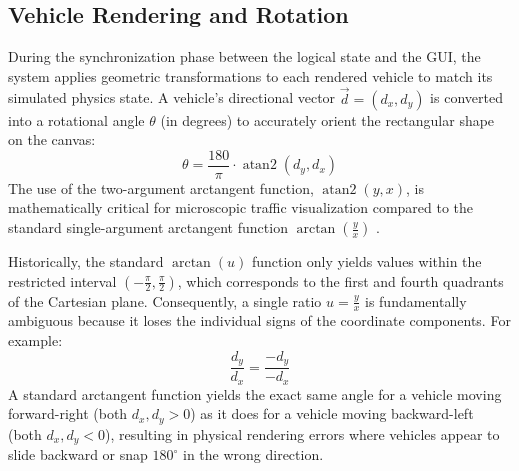 \documentclass[../report_main.tex]{subfiles}
\begin{document}
\subsection{Vehicle Rendering and Rotation}
During the synchronization phase between the logical state and the \gls{GUI}, the system applies geometric transformations to each rendered vehicle to match its simulated physics state. A vehicle's directional vector $\overrightarrow{d} = (d_x, d_y)$ is converted into a rotational angle $\theta$ (in degrees) to accurately orient the rectangular shape on the canvas:
\begin{equation}
    \theta = \frac{180}{\pi} \cdot \operatorname{atan2}(d_y, d_x)
\end{equation}
The use of the two-argument arctangent function, $\operatorname{atan2}(y, x)$, is mathematically critical for microscopic traffic visualization compared to the standard single-argument arctangent function $\arctan\left(\frac{y}{x}\right)$ \cite{giaitichToan}. 

Historically, the standard $\arctan(u)$ function only yields values within the restricted interval $\left(-\frac{\pi}{2}, \frac{\pi}{2}\right)$, which corresponds to the first and fourth quadrants of the Cartesian plane. Consequently, a single ratio $u = \frac{y}{x}$ is fundamentally ambiguous because it loses the individual signs of the coordinate components. For example:
\begin{equation}
    \frac{d_y}{d_x} = \frac{-d_y}{-d_x}
\end{equation}
A standard arctangent function yields the exact same angle for a vehicle moving forward-right (both $d_x, d_y > 0$) as it does for a vehicle moving backward-left (both $d_x, d_y < 0$), resulting in physical rendering errors where vehicles appear to slide backward or snap $180^\circ$ in the wrong direction. 
\end{document}
